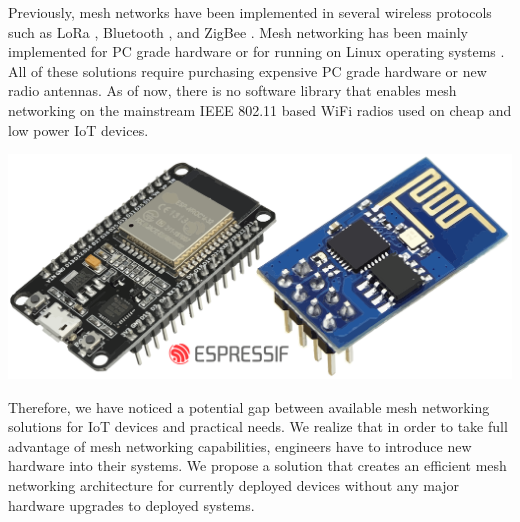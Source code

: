 \documentclass[conference]{IEEEtran}
\begin{document}
Previously, mesh networks have been implemented in several wireless protocols such as LoRa \cite{Ochoa_Guizar_Maman_Duda_2017}\cite{Lee_Ke_2018}, Bluetooth  \cite{Leonardi_Patti_Lo_Bello_2018}, and ZigBee \cite{Rodriguez_Ortiz_Uriarte_Yi_Jia_Yoshii_Ross_Beckman_2011}. Mesh networking has been mainly implemented for PC grade hardware or for running on Linux operating systems \cite{Riggio_Miorandi_Chlamtac_Scalabrino_Gregori_Granelli_Fang_2008}\cite{Riggio_Gomez_Rasheed_Gerola_Miorandi_2009}. All of these solutions require purchasing expensive PC grade hardware or new radio antennas. As of now, there is no software library that enables mesh networking on the mainstream IEEE 802.11 based WiFi radios used on cheap and low power IoT devices.

\begingroup
    \centering
    \medskip
    \includegraphics[width=0.4\columnwidth]{proposal/images/esp.png}
    \label{fig:failure}
    \medskip
\endgroup

Therefore, we have noticed a potential gap between available mesh networking solutions for IoT devices and practical needs. We realize that in order to take full advantage of mesh networking capabilities, engineers have to introduce new hardware into their systems. We propose a solution that creates an efficient mesh networking architecture for currently deployed devices without any major hardware upgrades to deployed systems.\\
\end{document}
